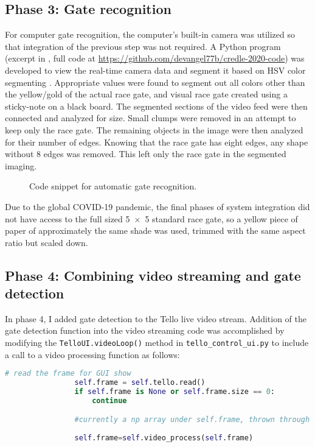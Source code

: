 \subsection{Phase 3: Gate recognition}
For computer gate recognition, the computer's built-in camera was utilized so that integration of the previous step was not required. A Python program (excerpt in , full code at \url{https://github.com/devangel77b/credle-2020-code}) was developed to view the real-time camera data and segment it based on HSV color segmenting \cite{bradski2008learning}. Appropriate values were found to segment out all colors other than the yellow/gold of the actual race gate, and visual race gate created using a sticky-note on a black board. The segmented sections of the video feed were then connected and analyzed for size. Small clumps were removed in an attempt to keep only the race gate. The remaining objects in the image were then analyzed for their number of edges. Knowing that the race gate has eight edges, any shape without 8 edges was removed. This left only the race gate in the segmented imaging.
\begin{figure}
\caption{Code snippet for automatic gate recognition.}
\label{fig:pseudocode3}

\end{figure}

Due to the global COVID-19 pandemic, the final phases of system integration did not have access to the full sized \SI{5x5}{\foot} standard race gate, so a yellow piece of paper of approximately the same shade was used, trimmed with the same aspect ratio but scaled down. 





\subsection{Phase 4: Combining video streaming and gate detection}
In phase 4, I added gate detection to the Tello live video stream.  Addition of the gate detection function into the video streaming code was accomplished by modifying the \lstinline{TelloUI.videoLoop()} method in \lstinline{tello_control_ui.py} to include a call to a video processing function as follows:
\begin{lstlisting}[language=python]
            # read the frame for GUI show
                self.frame = self.tello.read()
                if self.frame is None or self.frame.size == 0:
                    continue 

            	#currently a np array under self.frame, thrown through processing after being pulled but before being put into the gui
		
                self.frame=self.video_process(self.frame)
\end{lstlisting}

